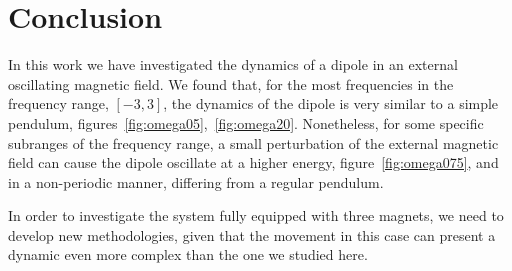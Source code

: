 \section{Conclusion}

In this work we have investigated the dynamics of a dipole in an external oscillating magnetic field. We found that, for the most frequencies in the frequency range, $[-3,3]$, the dynamics of the dipole is very similar to a simple pendulum, figures~\ref{fig:omega05},~\ref{fig:omega20}. Nonetheless, for some specific subranges of the frequency range, a small perturbation of the external magnetic field can cause the dipole oscillate at a higher energy, figure~\ref{fig:omega075}, and in a non-periodic manner, differing from a regular pendulum. 

In order to investigate the system fully equipped with three magnets, we need to develop new methodologies, given that the movement in this case can present a dynamic even more complex than the one we studied here. 